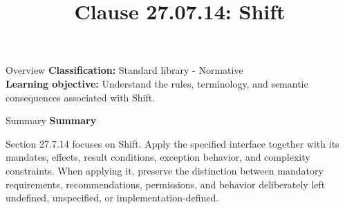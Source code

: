 \documentclass[10pt,letterpaper]{article}
\title{Clause 27.07.14: Shift}
\author{}
\date{}
\begin{document}
\maketitle
\begin{CornellOverviewBox}{Overview}
\textbf{Classification:} Standard library - Normative\\[2pt]
\textbf{Learning objective:} Understand the rules, terminology, and semantic consequences associated with Shift.
\end{CornellOverviewBox}\begin{CornellSummaryBox}{Summary}
{\sffamily\bfseries\color{Accent} Summary}\par\vspace{3pt}Section 27.7.14 focuses on Shift. Apply the specified interface together with its mandates, effects, result conditions, exception behavior, and complexity constraints. When applying it, preserve the distinction between mandatory requirements, recommendations, permissions, and behavior deliberately left undefined, unspecified, or implementation-defined.
\end{CornellSummaryBox}
\end{document}
